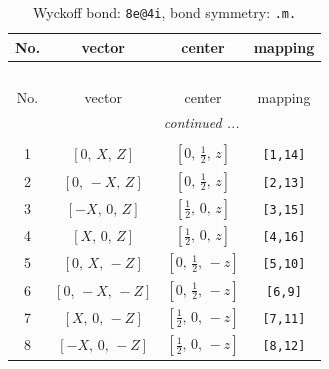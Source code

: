 \documentclass[fleqn,8pt]{jsarticle}
\begin{document}
\begin{longtable}{cccc}
\caption{Wyckoff bond: {\tt 8e@4i}, bond symmetry: {\tt .m.}}
 \\
 \hline \hline
No. & vector & center & mapping \\ \hline \endfirsthead

\multicolumn{3}{l}{\tablename\ \thetable{}} \\
 \hline \hline
No. & vector & center & mapping \\ \hline \endhead

 \hline \hline
\multicolumn{3}{r}{\footnotesize\it continued ...} \\ \endfoot

 \hline \hline
\multicolumn{3}{r}{} \\ \endlastfoot

1 & $\left[ 0,\, X,\, Z \right]$ & $\left[ 0,\, \frac{1}{2},\, z \right]$ & {\tt [1,14]} \\ \hline
2 & $\left[ 0,\, - X,\, Z \right]$ & $\left[ 0,\, \frac{1}{2},\, z \right]$ & {\tt [2,13]} \\ \hline
3 & $\left[ - X,\, 0,\, Z \right]$ & $\left[ \frac{1}{2},\, 0,\, z \right]$ & {\tt [3,15]} \\ \hline
4 & $\left[ X,\, 0,\, Z \right]$ & $\left[ \frac{1}{2},\, 0,\, z \right]$ & {\tt [4,16]} \\ \hline
5 & $\left[ 0,\, X,\, - Z \right]$ & $\left[ 0,\, \frac{1}{2},\, - z \right]$ & {\tt [5,10]} \\ \hline
6 & $\left[ 0,\, - X,\, - Z \right]$ & $\left[ 0,\, \frac{1}{2},\, - z \right]$ & {\tt [6,9]} \\ \hline
7 & $\left[ X,\, 0,\, - Z \right]$ & $\left[ \frac{1}{2},\, 0,\, - z \right]$ & {\tt [7,11]} \\ \hline
8 & $\left[ - X,\, 0,\, - Z \right]$ & $\left[ \frac{1}{2},\, 0,\, - z \right]$ & {\tt [8,12]} \\
\end{longtable}
\renewcommand{\arraystretch}{1.2}
\end{document}

